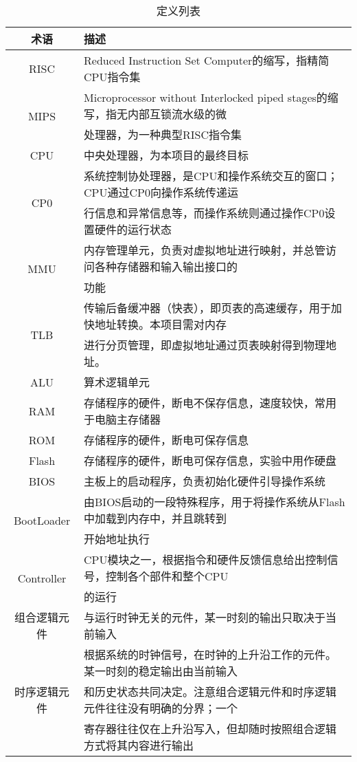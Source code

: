 \begin{table}[H]
	\centering
	\caption{定义列表}
	\begin{tabular}{|c|l|}
		\hline
		术语 & 描述 \\
		\hline
		RISC & Reduced Instruction Set Computer的缩写，指精简CPU指令集 \\
		\hline
		\multirow{2}{*}{MIPS} & Microprocessor without Interlocked piped stages的缩写，指无内部互锁流水级的微 \\
		& 处理器，为一种典型RISC指令集 \\
		\hline
		CPU & 中央处理器，为本项目的最终目标 \\
		\hline
		\multirow{2}{*}{CP0} & 系统控制协处理器，是CPU和操作系统交互的窗口；CPU通过CP0向操作系统传递运 \\
		& 行信息和异常信息等，而操作系统则通过操作CP0设置硬件的运行状态 \\
		\hline
		\multirow{2}{*}{MMU} & 内存管理单元，负责对虚拟地址进行映射，并总管访问各种存储器和输入输出接口的 \\
		& 功能 \\
		\hline
		\multirow{2}{*}{TLB} & 传输后备缓冲器（快表），即页表的高速缓存，用于加快地址转换。本项目需对内存 \\
		& 进行分页管理，即虚拟地址通过页表映射得到物理地址。 \\
		\hline
		ALU & 算术逻辑单元 \\
		\hline
		RAM & 存储程序的硬件，断电不保存信息，速度较快，常用于电脑主存储器 \\
		\hline
		ROM & 存储程序的硬件，断电可保存信息 \\
		\hline
		Flash & 存储程序的硬件，断电可保存信息，实验中用作硬盘 \\
		\hline
		BIOS & 主板上的启动程序，负责初始化硬件引导操作系统 \\
		\hline
		\multirow{2}{*}{BootLoader} & 由BIOS启动的一段特殊程序，用于将操作系统从Flash中加载到内存中，并且跳转到 \\
		& 开始地址执行 \\
		\hline
		\multirow{2}{*}{Controller} & CPU模块之一，根据指令和硬件反馈信息给出控制信号，控制各个部件和整个CPU \\
		& 的运行 \\
		\hline
		组合逻辑元件 & 与运行时钟无关的元件，某一时刻的输出只取决于当前输入 \\
		\hline
		\multirow{3}{*}{时序逻辑元件} & 根据系统的时钟信号，在时钟的上升沿工作的元件。某一时刻的稳定输出由当前输入 \\
		& 和历史状态共同决定。注意组合逻辑元件和时序逻辑元件往往没有明确的分界；一个 \\
		& 寄存器往往仅在上升沿写入，但却随时按照组合逻辑方式将其内容进行输出\\
		\hline
	\end{tabular}
\end{table}

